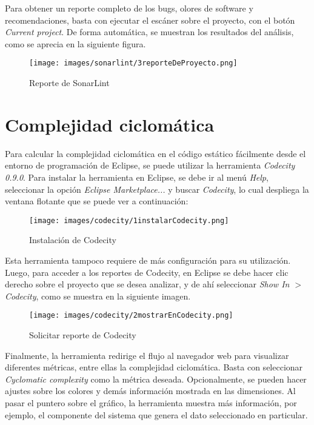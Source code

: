 \documentclass{scrreprt}
\begin{document}
Para obtener un reporte completo de los bugs, olores de software y recomendaciones, basta con ejecutar el escáner sobre el proyecto, con el botón \textit{Current project}. De forma automática, se muestran los resultados del análisis, como se aprecia en la siguiente figura.

\begin{figure}[H]
	\centering
    \texttt{[image: images/sonarlint/3reporteDeProyecto.png]}
    \caption{Reporte de SonarLint}
\end{figure}



\section{Complejidad ciclomática}

Para calcular la complejidad ciclomática en el código estático fácilmente desde el entorno de programación de Eclipse, se puede utilizar la herramienta \textit{Codecity 0.9.0}. Para instalar la herramienta en Eclipse, se debe ir al menú \textit{Help}, seleccionar la opción \textit{Eclipse Marketplace...} y buscar \textit{Codecity}, lo cual despliega la ventana flotante que se puede ver a continuación:

\begin{figure}[H]
	\centering
    \texttt{[image: images/codecity/1instalarCodecity.png]}
    \caption{Instalación de Codecity}
\end{figure}

Esta herramienta tampoco requiere de más configuración para su utilización. Luego, para acceder a los  reportes de Codecity, en Eclipse se debe hacer clic derecho sobre el proyecto que se desea analizar, y de ahí seleccionar \textit{Show In $>$ Codecity}, como se muestra en la siguiente imagen.

\begin{figure}[H]
	\centering
    \texttt{[image: images/codecity/2mostrarEnCodecity.png]}
    \caption{Solicitar reporte de Codecity}
\end{figure}

Finalmente, la herramienta redirige el flujo al navegador web para visualizar diferentes métricas, entre ellas la complejidad ciclomática. Basta con seleccionar \textit{Cyclomatic complexity} como la métrica deseada. Opcionalmente, se pueden hacer ajustes sobre los colores y demás información mostrada en las dimensiones. Al pasar el puntero sobre el gráfico, la herramienta muestra más información, por ejemplo, el componente del sistema que genera el dato seleccionado en particular.
\end{document}
